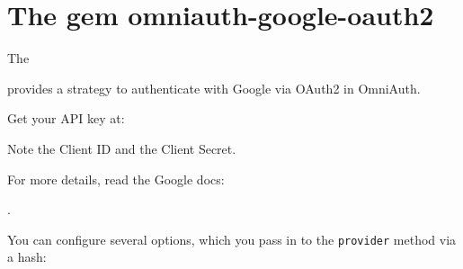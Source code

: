 \section{The gem omniauth-google-oauth2}

The 

provides a
strategy to authenticate with Google via OAuth2 in OmniAuth.

Get your API key at: 


Note the Client ID and the Client Secret.

For more details, read the Google docs: 

.


You can configure several options, which you pass in to the \verb|provider|
method via a hash:

